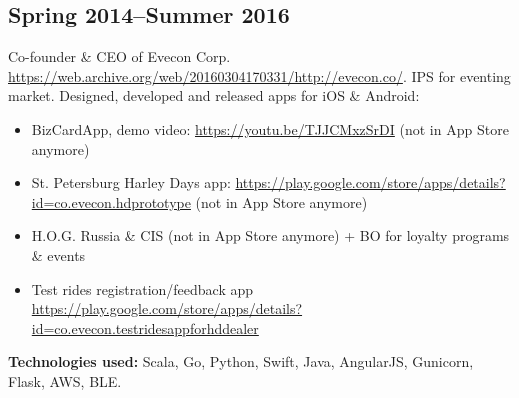 \subsection*{Spring 2014--Summer 2016}

Co-founder \& CEO of Evecon Corp.
\href{https://web.archive.org/web/20160304170331/http://evecon.co/}{\url{https://web.archive.org/web/20160304170331/http://evecon.co/}}.
IPS for eventing market. Designed, developed and released apps for iOS \& Android:
\begin{itemize}[noitemsep]
  \item BizCardApp, demo video: \href{https://youtu.be/TJJCMxzSrDI}{\url{https://youtu.be/TJJCMxzSrDI}} (not in App Store anymore)
  \item St. Petersburg Harley Days app: \href{https://play.google.com/store/apps/details?id=co.evecon.hdprototype}{\url{https://play.google.com/store/apps/details?id=co.evecon.hdprototype}} (not in App Store anymore)
  \item H.O.G. Russia \& CIS (not in App Store anymore) + BO for loyalty programs \& events
  \item Test rides registration/feedback app \href{https://play.google.com/store/apps/details?id=co.evecon.testridesappforhddealer}{\url{https://play.google.com/store/apps/details?id=co.evecon.testridesappforhddealer}}
\end{itemize}

\textbf{Technologies used:}
Scala, Go, Python, Swift, Java, AngularJS, Gunicorn, Flask, AWS, BLE.
